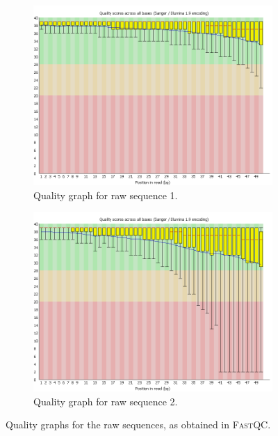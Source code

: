 \documentclass[10pt,twocolumn]{article}\usepackage[]{graphicx}\usepackage[]{color}
\begin{document}
\begin{figure}[ht]
     \centering
     \begin{subfigure}[b]{0.9\columnwidth}
         \centering
         \includegraphics[width=\textwidth]{outputs/quality1.png}
         \caption{Quality graph for raw sequence 1.}
     \end{subfigure}
     \hfill
     \begin{subfigure}[b]{0.9\columnwidth}
         \centering
         \includegraphics[width=\textwidth]{outputs/quality2.png}
         \caption{Quality graph for raw sequence 2.}
     \end{subfigure}
        \caption{Quality graphs for the raw sequences, as obtained in \textsc{FastQC}.}
        \label{fig:sequence-quality}
\end{figure}
\end{document}
